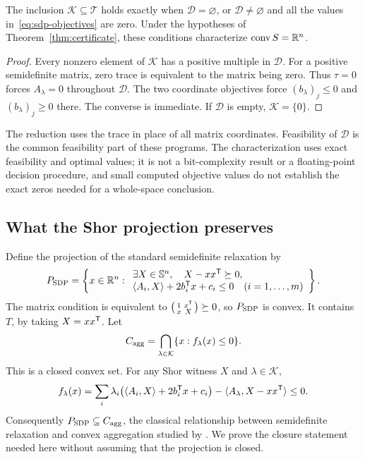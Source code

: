 \begin{corollary}\label{cor:finite-sdp}
The inclusion $\mathcal K\subseteq\mathcal T$ holds exactly when
$\mathcal D=\varnothing$, or $\mathcal D\ne\varnothing$ and all the
values in~\eqref{eq:sdp-objectives} are zero. Under the hypotheses of
Theorem~\ref{thm:certificate}, these conditions characterize
$\operatorname{conv} S=\mathbb R^n$.
\end{corollary}
\begin{proof}
Every nonzero element of $\mathcal K$ has a positive multiple in
$\mathcal D$. For a positive semidefinite matrix, zero trace is
equivalent to the matrix being zero. Thus $\tau=0$ forces
$A_\lambda=0$ throughout $\mathcal D$. The two coordinate objectives
force $(b_\lambda)_j\leq0$ and $(b_\lambda)_j\geq0$ there. The converse
is immediate. If $\mathcal D$ is empty, $\mathcal K=\{0\}$.
\end{proof}

The reduction uses the trace in place of all matrix coordinates.
Feasibility of $\mathcal D$ is the common feasibility part of these
programs. The characterization uses exact feasibility and optimal values;
it is not a bit-complexity result or a floating-point decision procedure,
and small computed objective values do not establish the exact zeros
needed for a whole-space conclusion.

\subsection{What the Shor projection preserves}

Define the projection of the standard semidefinite relaxation by
\begin{equation}\label{eq:shor}
 P_{\rm SDP}=\left\{x\in\mathbb R^n:\begin{array}{l}
       \exists X\in\mathbb S^n,\quad X-xx^{\mathsf T}\succeq0,\\
       \langle A_i,X\rangle+2b_i^{\mathsf T} x+c_i\leq0
                      \quad(i=1,\ldots,m)
      \end{array}\right\}.
\end{equation}
The matrix condition is equivalent to
$\left(\begin{smallmatrix}1&x^{\mathsf T}\\x&X\end{smallmatrix}\right)
\succeq0$, so $P_{\rm SDP}$ is convex. It contains $T$, by taking $X=xx^{\mathsf T}$.
Let
\begin{equation}\label{eq:convex-aggregation-intersection}
 C_{\rm agg}=\bigcap_{\lambda\in\mathcal K}\{x:f_\lambda(x)\leq0\}.
\end{equation}
This is a closed convex set. For any Shor witness $X$ and
$\lambda\in\mathcal K$,
\begin{equation}\label{eq:shor-aggregation}
 f_\lambda(x)=
 \sum_i\lambda_i\bigl(\langle A_i,X\rangle+2b_i^{\mathsf T} x+c_i\bigr)
       -\langle A_\lambda,X-xx^{\mathsf T}\rangle\leq0.
\end{equation}
Consequently $P_{\rm SDP}\subseteq C_{\rm agg}$, the classical
relationship between semidefinite relaxation and convex aggregation
studied by \citet{FujieKojima1997,KojimaTuncel2000}. We prove the
closure statement needed here without assuming that the projection is
closed.

